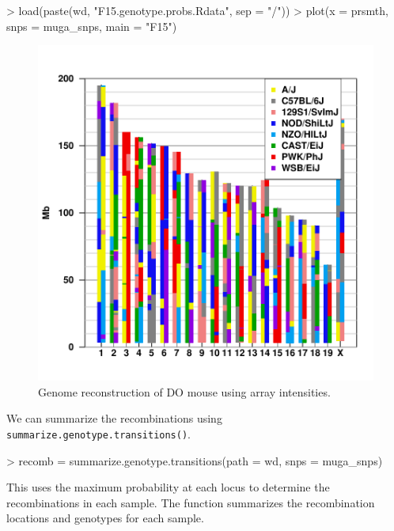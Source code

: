 \documentclass{article}
\begin{document}
\begin{Schunk}
\begin{Sinput}
> load(paste(wd, "F15.genotype.probs.Rdata", sep = "/"))
> plot(x = prsmth, snps = muga_snps, main = "F15")
\end{Sinput}
\end{Schunk}

\begin{figure}
\begin{center}
\includegraphics{Genotyping_DO_Mice-fig2}
\end{center}
\caption{Genome reconstruction of DO mouse using array intensities. }
\label{fig:intensity_genoplot}
\end{figure}

We can summarize the recombinations using \texttt{summarize.genotype.transitions()}. 

\begin{Schunk}
\begin{Sinput}
> recomb = summarize.genotype.transitions(path = wd, snps = muga_snps)
\end{Sinput}
\end{Schunk}

This uses the maximum probability at each locus to determine the recombinations in each sample. The function summarizes the recombination locations and genotypes for each sample.
\end{document}
